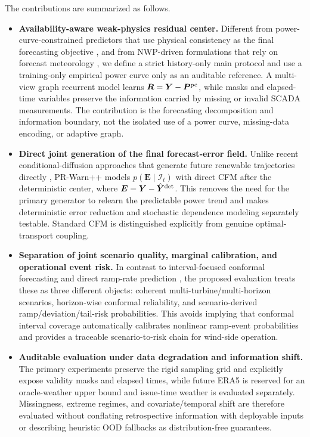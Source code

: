 \documentclass[journal]{IEEEtran}
\newcommand{\1}{\mathbb{I}}
\begin{document}
The contributions are summarized as follows.
\begin{itemize}
\item \textbf{Availability-aware weak-physics residual center.} Different from power-curve-constrained predictors that use physical consistency as the final forecasting objective \cite{gao2025tgdpF,liu2024physicsrl}, and from NWP-driven formulations that rely on forecast meteorology \cite{zhang2026transitional,cao2026joint}, we define a strict history-only main protocol and use a training-only empirical power curve only as an auditable reference. A multi-view graph recurrent model learns $\bm R=\bm Y-\bm P^{\rm pc}$, while masks and elapsed-time variables preserve the information carried by missing or invalid SCADA measurements. The contribution is the forecasting decomposition and information boundary, not the isolated use of a power curve, missing-data encoding, or adaptive graph.

\item \textbf{Direct joint generation of the final forecast-error field.} Unlike recent conditional-diffusion approaches that generate future renewable trajectories directly \cite{gao2026diffusion,ma2026stgld}, PR-Warn++ models $p(\bm E\mid\mathcal I_t)$ with direct CFM after the deterministic center, where $\bm E=\bm Y-\hat{\bm Y}^{\rm det}$. This removes the need for the primary generator to relearn the predictable power trend and makes deterministic error reduction and stochastic dependence modeling separately testable. Standard CFM is distinguished explicitly from genuine optimal-transport coupling.

\item \textbf{Separation of joint scenario quality, marginal calibration, and operational event risk.} In contrast to interval-focused conformal forecasting \cite{jonkers2024conformal,chen2024interval} and direct ramp-rate prediction \cite{ko2026ramp}, the proposed evaluation treats these as three different objects: coherent multi-turbine/multi-horizon scenarios, horizon-wise conformal reliability, and scenario-derived ramp/deviation/tail-risk probabilities. This avoids implying that conformal interval coverage automatically calibrates nonlinear ramp-event probabilities and provides a traceable scenario-to-risk chain for wind-side operation.

\item \textbf{Auditable evaluation under data degradation and information shift.} The primary experiments preserve the rigid sampling grid and explicitly expose validity masks and elapsed times, while future ERA5 is reserved for an oracle-weather upper bound and issue-time weather is evaluated separately. Missingness, extreme regimes, and covariate/temporal shift are therefore evaluated without conflating retrospective information with deployable inputs or describing heuristic OOD fallbacks as distribution-free guarantees.
\end{itemize}
\end{document}
